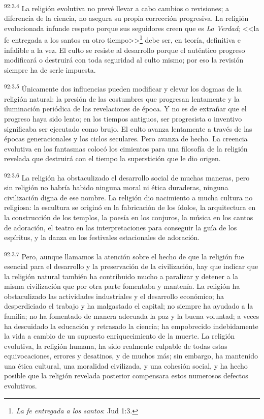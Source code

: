\par
\textsuperscript{92:3.4} La religión evolutiva no prevé llevar a cabo cambios o revisiones; a diferencia de la ciencia, no asegura su propia corrección progresiva. La religión evolucionada infunde respeto porque sus seguidores creen que es \textit{La Verdad}; <<la fe entregada a los santos en otro tiempo>>\footnote{\textit{La fe entregada a los santos}: Jud 1:3.} debe ser, en teoría, definitiva e infalible a la vez. El culto se resiste al desarrollo porque el auténtico progreso modificará o destruirá con toda seguridad al culto mismo; por eso la revisión siempre ha de serle impuesta.

\par
\textsuperscript{92:3.5} Únicamente dos influencias pueden modificar y elevar los dogmas de la religión natural: la presión de las costumbres que progresan lentamente y la iluminación periódica de las revelaciones de época. Y no es de extrañar que el progreso haya sido lento; en los tiempos antiguos, ser progresista o inventivo significaba ser ejecutado como brujo. El culto avanza lentamente a través de las épocas generacionales y los ciclos seculares. Pero avanza de hecho. La creencia evolutiva en los fantasmas colocó los cimientos para una filosofía de la religión revelada que destruirá con el tiempo la superstición que le dio origen.

\par
\textsuperscript{92:3.6} La religión ha obstaculizado el desarrollo social de muchas maneras, pero sin religión no habría habido ninguna moral ni ética duraderas, ninguna civilización digna de ese nombre. La religión dio nacimiento a mucha cultura no religiosa: la escultura se originó en la fabricación de los ídolos, la arquitectura en la construcción de los templos, la poesía en los conjuros, la música en los cantos de adoración, el teatro en las interpretaciones para conseguir la guía de los espíritus, y la danza en los festivales estacionales de adoración.

\par
\textsuperscript{92:3.7} Pero, aunque llamamos la atención sobre el hecho de que la religión fue esencial para el desarrollo y la preservación de la civilización, hay que indicar que la religión natural también ha contribuido mucho a paralizar y detener a la misma civilización que por otra parte fomentaba y mantenía. La religión ha obstaculizado las actividades industriales y el desarrollo económico; ha desperdiciado el trabajo y ha malgastado el capital; no siempre ha ayudado a la familia; no ha fomentado de manera adecuada la paz y la buena voluntad; a veces ha descuidado la educación y retrasado la ciencia; ha empobrecido indebidamente la vida a cambio de un supuesto enriquecimiento de la muerte. La religión evolutiva, la religión humana, ha sido realmente culpable de todas estas equivocaciones, errores y desatinos, y de muchos más; sin embargo, ha mantenido una ética cultural, una moralidad civilizada, y una cohesión social, y ha hecho posible que la religión revelada posterior compensara estos numerosos defectos evolutivos.

